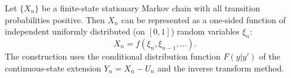 Let $\{X_n\}$ be a finite-state stationary Markov chain with all transition probabilities positive. Then $X_n$ can be represented as a one-sided function of independent uniformly distributed (on $[0,1]$) random variables $\xi_n$:
$$X_n = f(\xi_n, \xi_{n-1}, \ldots).$$
The construction uses the conditional distribution function $F(y|y')$ of the continuous-state extension $Y_n = X_n - U_n$ and the inverse transform method.
